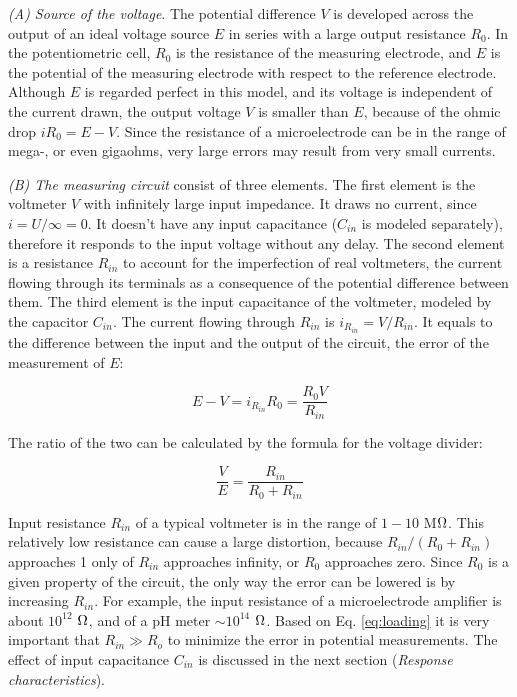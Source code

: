 \emph{(A) Source of the voltage}.
The potential difference $V$ is developed across the output of an ideal voltage source $E$ in series with a large output resistance $R_0$.
In the potentiometric cell, $R_0$ is the resistance of the measuring electrode, and $E$ is the potential of the measuring electrode with respect to the reference electrode.
Although $E$ is regarded perfect in this model, and its voltage is independent of the current drawn, the output voltage $V$ is smaller than $E$, because of the ohmic drop $iR_0 = E - V$.
Since the resistance of a microelectrode can be in the range of mega-, or even gigaohms, very large errors may result from very small currents.

\emph{(B) The measuring circuit} consist of three elements.
The first element is the voltmeter $V$ with infinitely large input impedance. It draws no current, since $i = U/\infty=0$. It doesn't have any input capacitance ($C_{in}$ is modeled separately), therefore it responds to the input voltage without any delay.
The second element is a resistance $R_{in}$ to account for the imperfection of real voltmeters, the current flowing through its terminals as a consequence of the potential difference between them.
The third element is the input capacitance of the voltmeter, modeled by the capacitor $C_{in}$.
The current flowing through $R_{in}$ is $i_{R_{in}}=V/R_{in}$. It equals to the difference between the input and the output of the circuit, the error of the measurement of $E$:

\begin{equation}
\label{eq:loading}
	E - V = i_{R_{in}} R_0 = \frac{R_0 V}{R_{in}}
\end{equation}

The ratio of the two can be calculated by the formula for the voltage divider: 

\begin{equation}
\label{eq:loading2}
        \frac{V}{E} = \frac{R_{in}}{R_0+R_{in}}
\end{equation}

Input resistance $R_{in}$ of a typical voltmeter is in the range of $1-10$ M$\ohm$.
This relatively low resistance can cause a large distortion, because $R_{in}/(R_0+R_{in})$ approaches 1 only of $R_{in}$ approaches infinity, or $R_0$ approaches zero.
Since $R_0$ is a given property of the circuit, the only way the error can be lowered is by increasing $R_{in}$.
For example, the input resistance of a microelectrode amplifier is about $10^{12}$ $\ohm$, and of a pH meter $\sim 10^{14}$ $\ohm$.
Based on Eq. \ref{eq:loading} it is very important that $R_{in} \gg R_o$ to minimize the error in potential measurements.
The effect of input capacitance $C_{in}$ is discussed in the next section (\emph{Response characteristics}).

